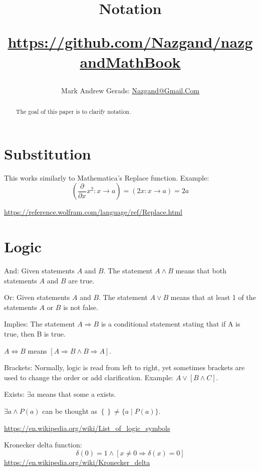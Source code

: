 \documentclass[]{article}
\author{Mark Andrew Gerads: \href{MailTo:Nazgand@Gmail.Com}{Nazgand@Gmail.Com}}
\title{
	Notation
	
	\href{https://github.com/Nazgand/nazgandMathBook}{https://github.com/Nazgand/nazgandMathBook}
}
\newcommand{\pqty}[1]{{\left(#1\right)}}
\newcommand{\Bqty}[1]{{\left\{#1\right\}}}
\newcommand{\bqty}[1]{{\left[#1\right]}}
\newcommand{\pdiff}[2]{\frac{\partial^{#2}}{\partial #1^{#2}}}
\numberwithin{equation}{section}
\begin{document}
	
	\maketitle
	
	\begin{abstract}
		The goal of this paper is to clarify notation.
	\end{abstract}
	
	\section{Substitution}
	This works similarly to Mathematica's Replace function. Example:
	\begin{equation}
	\pqty{\pdiff{x}{}x^2:x\to a}=
	\pqty{2x:x\to a}=2a
	\end{equation}
	
	\url{https://reference.wolfram.com/language/ref/Replace.html}
	
	\section{Logic}
	
	And: Given statements \(A\) and \(B\). The statement \(A\land B\) means that both statements \(A\) and \(B\) are true.
	
	Or: Given statements \(A\) and \(B\). The statement \(A\lor B\) means that at least 1 of the statements \(A\) or \(B\) is not false.
	
	Implies: The statement \(A\Rightarrow B\) is a conditional statement stating that if A is true, then B is true. 
	
	\(A\Leftrightarrow B\) means \(\bqty{A\Rightarrow B\land B\Rightarrow A}\).
	
	Brackets: Normally, logic is read from left to right, yet sometimes brackets are used to change the order or add clarification. Example: \(A\lor\bqty{B\land C}\).
	
	Exists: \(\exists a\) means that some a exists.
	
	\(\exists a\land P\pqty{a}\) can be thought as \(\Bqty{}\neq\{a\mid P\pqty{a}\}\).
	
	\url{https://en.wikipedia.org/wiki/List_of_logic_symbols}
	
	Kronecker delta function:
	\begin{equation}
	\delta\pqty{0}=1
	\land
	\bqty{x\neq 0 \Rightarrow \delta\pqty{x}=0}
	\end{equation}
	\url{https://en.wikipedia.org/wiki/Kronecker_delta}
	
\end{document}

